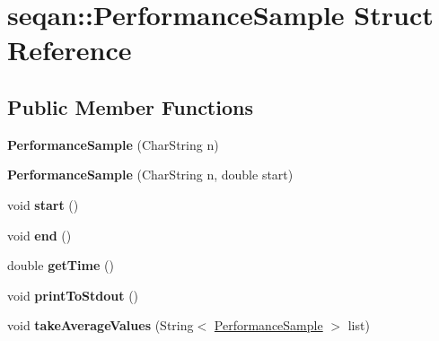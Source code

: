 \hypertarget{structseqan_1_1_performance_sample}{\section{seqan\-:\-:\-Performance\-Sample \-Struct \-Reference}
\label{structseqan_1_1_performance_sample}
}
\subsection*{\-Public \-Member \-Functions}
\begin{DoxyCompactItemize}
\item 
\hypertarget{structseqan_1_1_performance_sample_a715fe9ca22322f3d51e27e19783ca11d}{{\bfseries \-Performance\-Sample} (\-Char\-String n)}\label{structseqan_1_1_performance_sample_a715fe9ca22322f3d51e27e19783ca11d}

\item 
\hypertarget{structseqan_1_1_performance_sample_abb034f31c5c550ce6c027806df55f2cb}{{\bfseries \-Performance\-Sample} (\-Char\-String n, double start)}\label{structseqan_1_1_performance_sample_abb034f31c5c550ce6c027806df55f2cb}

\item 
\hypertarget{structseqan_1_1_performance_sample_aa32edc31e6ad815364f5351959bef27f}{void {\bfseries start} ()}\label{structseqan_1_1_performance_sample_aa32edc31e6ad815364f5351959bef27f}

\item 
\hypertarget{structseqan_1_1_performance_sample_a77c483d55c1ce27e7e436d968ec24752}{void {\bfseries end} ()}\label{structseqan_1_1_performance_sample_a77c483d55c1ce27e7e436d968ec24752}

\item 
\hypertarget{structseqan_1_1_performance_sample_a5eff59afa1efeb5ff09975f2a70c6795}{double {\bfseries get\-Time} ()}\label{structseqan_1_1_performance_sample_a5eff59afa1efeb5ff09975f2a70c6795}

\item 
\hypertarget{structseqan_1_1_performance_sample_a339cf52d519b7948043f9aa1ea152eb6}{void {\bfseries print\-To\-Stdout} ()}\label{structseqan_1_1_performance_sample_a339cf52d519b7948043f9aa1ea152eb6}

\item 
\hypertarget{structseqan_1_1_performance_sample_a3fbe8137dc6639d13c536f1e5f5d9bd2}{void {\bfseries take\-Average\-Values} (\-String$<$ \hyperlink{structseqan_1_1_performance_sample}{\-Performance\-Sample} $>$ list)}\label{structseqan_1_1_performance_sample_a3fbe8137dc6639d13c536f1e5f5d9bd2}

\end{DoxyCompactItemize}
